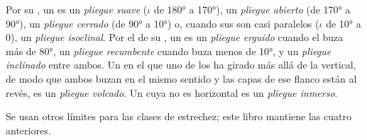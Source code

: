 \begin{definition}\label{def:b1:faults-folds-fabrics:fold-classes}
Por su , un  es un \emph{pliegue suave} ($\iota$ de \ang{180} a \ang{170}), un
\emph{pliegue abierto} (de \ang{170} a \ang{90}), un \emph{pliegue cerrado} (de
\ang{90} a \ang{10}) o, cuando sus  son casi paralelos ($\iota$ de \ang{10} a $0$), un \emph{pliegue isoclinal}.
Por el  de su , un  es un \emph{pliegue erguido} cuando el  buza más
de \ang{80}, un \emph{pliegue recumbente} cuando buza menos de \ang{10}, y un \emph{pliegue inclinado} entre ambos. Un  en el que uno de los  ha girado más allá de la vertical, de modo que ambos  buzan
en el mismo sentido y las capas de ese flanco están al revés, es un \emph{pliegue volcado}. Un  cuya
 no es horizontal es un \emph{pliegue inmerso}.
\end{definition}
Se usan otros límites para las clases de estrechez; este libro mantiene las cuatro anteriores.

